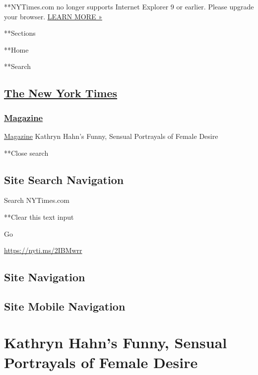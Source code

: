  **NYTimes.com no longer supports Internet Explorer 9 or earlier. Please
upgrade your browser.
\href{http://www.nytimes3xbfgragh.onion/content/help/site/ie9-support.html}{LEARN
MORE »}

**Sections

**Home

**Search

\hypertarget{the-new-york-times}{%
\subsection{\texorpdfstring{\href{http://www.nytimes3xbfgragh.onion/}{The
New York Times}}{The New York Times}}\label{the-new-york-times}}

\hypertarget{-magazine-}{%
\subsubsection{\texorpdfstring{
\href{https://www.nytimes3xbfgragh.onion/section/magazine}{Magazine}
}{ Magazine }}\label{-magazine-}}

 \href{https://www.nytimes3xbfgragh.onion/section/magazine}{Magazine}
\textbar{}Kathryn Hahn's Funny, Sensual Portrayals of Female Desire

**Close search

\hypertarget{site-search-navigation}{%
\subsection{Site Search Navigation}\label{site-search-navigation}}

Search NYTimes.com

**Clear this text input

Go

\url{https://nyti.ms/2IBMwrr}

\hypertarget{site-navigation}{%
\subsection{Site Navigation}\label{site-navigation}}

\hypertarget{site-mobile-navigation}{%
\subsection{Site Mobile Navigation}\label{site-mobile-navigation}}

\hypertarget{kathryn-hahns-funny-sensual-portrayals-of-female-desire}{%
\section{Kathryn Hahn's Funny, Sensual Portrayals of Female
Desire}\label{kathryn-hahns-funny-sensual-portrayals-of-female-desire}}

